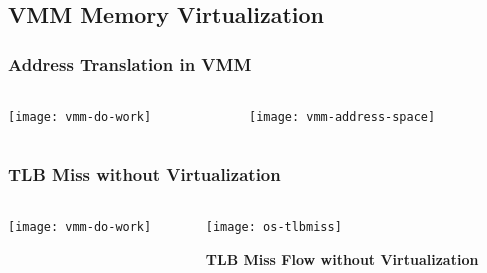 \subsection{VMM Memory Virtualization}
\begin{frame}
	\frametitle{Address Translation in VMM}
	
	
	
	\begin{columns}
		
		\begin{column}{.25\textwidth}
			
			\texttt{[image: vmm-do-work]}
			
		\end{column}
		
		\begin{column}{.75\textwidth}
			
			
			\centering
			\texttt{[image: vmm-address-space]}	

		\end{column}
		
		
	\end{columns}
	
	
\end{frame}


\begin{frame}
	\frametitle{TLB Miss without Virtualization}
	
	
	
	\begin{columns}
		
		\begin{column}{.25\textwidth}
			
			\texttt{[image: vmm-do-work]}
			
		\end{column}
		
		\begin{column}{.75\textwidth}
			
			
			\centering
			\texttt{[image: os-tlbmiss]}	
			
			\textbf{TLB Miss Flow without Virtualization}
			
			
			
		\end{column}
		
		
	\end{columns}
	
	
\end{frame}


